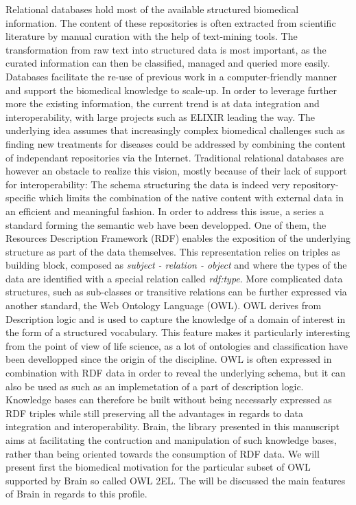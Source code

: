 \documentclass{bioinfo}
\begin{document}
Relational databases hold most of the available structured biomedical information. The content of these repositories is often
extracted from scientific literature by manual curation with the help of text-mining tools. The transformation from raw text into
structured data is most important, as the curated information can then be classified, managed and queried more easily. Databases facilitate
the re-use of previous work in a computer-friendly manner and support the biomedical knowledge to scale-up. In order to leverage further 
more the existing information, the current trend is at data integration and interoperability, with large projects such as ELIXIR leading the way.
The underlying idea assumes that increasingly complex biomedical challenges such as finding new treatments for diseases could be addressed 
by combining the content of independant repositories via the Internet. 
Traditional relational databases are however an obstacle to realize this vision, mostly because of their lack of support for interoperability:
The schema structuring the data is indeed very repository-specific which limits the combination of the native content with external data in an
efficient and meaningful fashion. In order to address this issue, a series a standard forming the semantic web have been developped. One of them,
the Resources Description Framework (RDF) enables the exposition of the underlying structure as part of the data themselves. This
representation relies on triples as building block, composed as \emph{subject - relation - object} and where 
the types of the data are identified with a special relation called \emph{rdf:type}. More complicated data structures, such as sub-classes or
transitive relations can be further expressed via another standard, the Web Ontology Language (OWL). OWL derives from Description logic and
is used to capture the knowledge of a domain of interest in the form of a structured vocabulary. This feature makes it particularly 
interesting from the point of view of life science, as a lot of ontologies and classification have been devellopped since the origin of 
the discipline. OWL is often expressed in combination with RDF data in order to reveal the underlying schema, but 
it can also be used as such as an implemetation of a part of description logic. 
Knowledge bases can therefore be built without being necessarly expressed as RDF triples while still preserving all the advantages in regards 
to data integration and interoperability.
Brain, the library presented in this manuscript aims at facilitating the contruction and manipulation of 
such knowledge bases, rather than being oriented towards the consumption of RDF data. We will present first the biomedical motivation for 
the particular subset of OWL supported by Brain so called OWL 2EL. The will be discussed the main features of Brain in regards to this profile.
\end{document}
